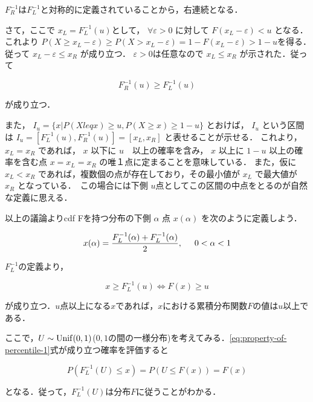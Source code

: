 \documentclass[12pt,a4j,draft]{jarticle}
\numberwithin{equation}{section}
\theoremstyle{break}
\newcommand{\inv}[1]{#1^{-1}}
\begin{document}
$\inv{F_R}$は$\inv{F_L}$と対称的に定義されていることから，右連続となる．

さて，ここで $x_L = \inv{F_L}(u) $として， $\forall \varepsilon > 0$ に対して $F(x_L - \varepsilon) < u$ となる．これより $P(X \geq x_L - \varepsilon) \geq P(X > x_L - \varepsilon) = 1 - F(x_L - \varepsilon) > 1 - u$を得る．　従って $x_L - \varepsilon \leq x_R$ が成り立つ． $\varepsilon > 0$は任意なので $x_L \leq x_R$ が示された．従って

\begin{equation}
    \inv{F_R}(u) \geq \inv{F_L}(u)
\end{equation}

が成り立つ．

また， $I_u = \{ x | P(X leq x) \geq u, P(X \geq x) \geq 1 - u \}$ とおけば， $I_u$ という区間は $I_u = [\inv{F_L}(u), \inv{F_R}(u)] = [x_L, x_R]$ と表せることが示せる． これより， $x_L = x_R$ であれば， $x$ 以下に $u$　以上の確率を含み， $x$ 以上に $1-u$ 以上の確率を含む点 $x = x_L = x_R$ の唯１点に定まることを意味している．
また，仮に $x_L < x_R$ であれば，複数個の点が存在しており，その最小値が $x_L$ で最大値が $x_R$ となっている．　この場合には下側 $u$点としてこの区間の中点をとるのが自然な定義に思える．

以上の議論よりcdf Fを持つ分布の下側 $\alpha$ 点 $x(\alpha)$ を次のように定義しよう．

\begin{equation}
    \label{eq:def-lower-probability-2}
    x(\alpha) = \frac{\inv{F_L}(\alpha) + \inv{F_L}(\alpha)}{2}, \hspace{5mm} 0 < \alpha < 1
\end{equation}

$\inv{F_L}$の定義より，

\begin{equation}
    \label{eq:property-of-percentile-1}
    x \geq \inv{F_L}(u) \Longleftrightarrow F(x) \geq u
\end{equation}

が成り立つ．$u$点以上になる$x$であれば，$x$における累積分布関数$F$の値は$u$以上である．

ここで，$U \sim {\rm Unif}(0,1)$($0,1$の間の一様分布)を考えてみる．\eqref{eq:property-of-percentile-1}式が成り立つ確率を評価すると

\begin{equation}
    P(\inv{F_L}(U) \leq x) = P(U \leq F(x)) = F(x)
\end{equation}

となる．従って，$\inv{F_L}(U)$は分布$F$に従うことがわかる．
\end{document}
